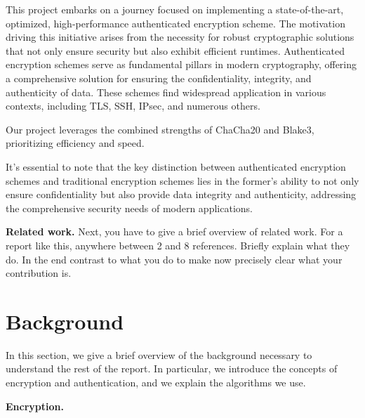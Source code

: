 \documentclass[letterpaper]{article}
\newcommand{\mypar}[1]{{\bf #1.}}
\begin{document}
This project embarks on a journey focused on implementing a state-of-the-art, optimized, high-performance authenticated encryption scheme. The motivation driving this initiative arises from the necessity for robust cryptographic solutions that not only ensure security but also exhibit efficient runtimes. Authenticated encryption schemes serve as fundamental pillars in modern cryptography, offering a comprehensive solution for ensuring the confidentiality, integrity, and authenticity of data. These schemes find widespread application in various contexts, including TLS, SSH, IPsec, and numerous others.

Our project leverages the combined strengths of ChaCha20 and Blake3, prioritizing efficiency and speed.

It's essential to note that the key distinction between authenticated encryption schemes and traditional encryption schemes lies in the former's ability to not only ensure confidentiality but also provide data integrity and authenticity, addressing the comprehensive security needs of modern applications.

\mypar{Related work} Next, you have to give a brief overview of
related work. For a report like this, anywhere between 2 and 8
references. Briefly explain what they do. In the end contrast to what
you do to make now precisely clear what your contribution is.

\section{Background}\label{sec:background}
In this section, we give a brief overview of the background necessary to understand the rest of the report.
In particular, we introduce the concepts of encryption and authentication, and we explain the algorithms we use.

\mypar{Encryption}
\end{document}
